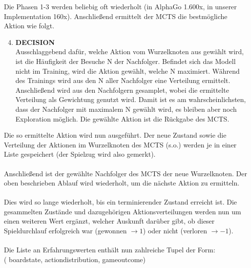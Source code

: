 	Die Phasen 1-3 werden beliebig oft wiederholt (in AlphaGo 1.600x, in unserer Implementation 160x). Anschließend ermittelt der MCTS die bestmögliche Aktion wie folgt.
\begin{enumerate}\setcounter{enumi}{3}
	\item \textbf{DECISION}\\
	Ausschlaggebend dafür, welche Aktion vom Wurzelknoten aus gewählt wird, ist die Häufigkeit der Besuche N der Nachfolger. 
	Befindet sich das Modell nicht im Training, wird die Aktion gewählt, welche N maximiert.
	Während des Trainings wird aus den N aller Nachfolger eine Verteilung ermittelt. Anschließend wird aus den Nachfolgern gesamplet, wobei die ermittelte Verteilung als Gewichtung genutzt wird. Damit ist es am wahrscheinlichsten, dass der Nachfolger mit maximalem N gewählt wird, es bleiben aber noch Exploration möglich.
	Die gewählte Aktion ist die Rückgabe des MCTS.
\end{enumerate}
Die so ermittelte Aktion wird nun ausgeführt. Der neue Zustand sowie die Verteilung der Aktionen im Wurzelknoten des MCTS (s.o.) werden je in einer Liste gespeichert (der Spielzug wird also gemerkt).
\\\\
Anschließend ist der gewählte Nachfolger des MCTS der neue Wurzelknoten. Der oben beschrieben Ablauf wird wiederholt, um die nächste Aktion zu ermitteln.
\\\\
Dies wird so lange wiederholt, bis ein terminierender Zustand erreicht ist. Die gesammelten Zustände und dazugehörigen Aktionsverteilungen werden nun um einen weiteren Wert ergänzt, welcher Auskunft darüber gibt, ob dieser Spieldurchlauf erfolgreich war (gewonnen $\rightarrow 1$) oder nicht (verloren $\rightarrow -1$).
\\\\
Die Liste an Erfahrungswerten enthält nun zahlreiche Tupel der Form:\\
( board\textunderscore{}state, action\textunderscore{}distribution, game\textunderscore{}outcome)


